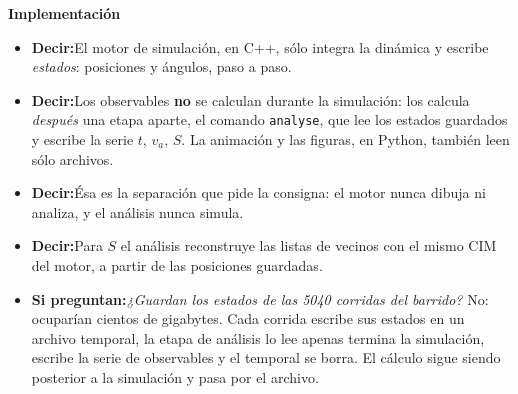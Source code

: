 \documentclass[10pt,a4paper]{article}
\newcommand{\va}{\ensuremath{v_a}}
\newcommand{\diapo}[3]{%
    \needspace{5\baselineskip}%
    \vspace{0.7em}%
    \noindent\colorbox{azul}{\makebox[2.1em]{\color{white}\bfseries\small #1}}%
    \colorbox{grisclaro}{\makebox[\dimexpr\linewidth-2.1em-4\fboxsep\relax][l]{%
        \color{azul}\bfseries\small\hspace{0.4em}#2\hfill
        {\color{gris}\mdseries #3}\hspace{0.4em}}}%
    \par\vspace{0.35em}}
\newcommand{\decir}{\textbf{\color{azul}Decir:}\;}
\newcommand{\preg}{\textbf{\color{gris}Si preguntan:}\;}
\newenvironment{notas}
    {\begin{itemize}[leftmargin=1.1em,itemsep=0.15em,topsep=0.15em,parsep=0pt]}
    {\end{itemize}}
\begin{document}
\vspace{0.7em}
{\large\bfseries\color{azul} Implementación}
\vspace{-0.2em}

\diapo{5}{Arquitectura}{\SI{40}{s}}
\begin{notas}
    \item \decir El motor de simulación, en C++, sólo integra la dinámica y
          escribe \emph{estados}: posiciones y ángulos, paso a paso.
    \item \decir Los observables \textbf{no} se calculan durante la
          simulación: los calcula \emph{después} una etapa aparte, el comando
          \texttt{analyse}, que lee los estados guardados y escribe la serie
          $t$, \va, $S$. La animación y las figuras, en Python, también leen
          sólo archivos.
    \item \decir Ésa es la separación que pide la consigna: el motor nunca
          dibuja ni analiza, y el análisis nunca simula.
    \item \decir Para $S$ el análisis reconstruye las listas de vecinos con el
          mismo CIM del motor, a partir de las posiciones guardadas.
    \item \preg \emph{¿Guardan los estados de las \num{5040} corridas del
          barrido?} No: ocuparían cientos de gigabytes. Cada corrida escribe
          sus estados en un archivo temporal, la etapa de análisis lo lee
          apenas termina la simulación, escribe la serie de observables y el
          temporal se borra. El cálculo sigue siendo posterior a la
          simulación y pasa por el archivo.
\end{notas}
\end{document}
